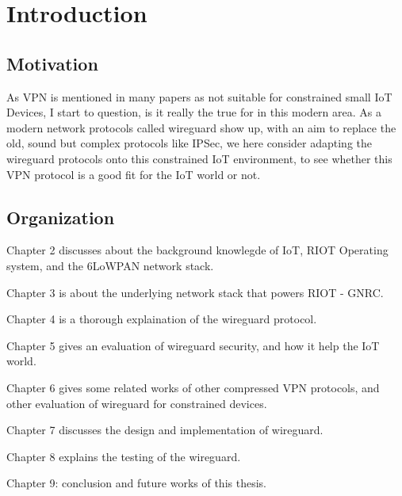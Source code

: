 \chapter{Introduction}
\section{Motivation}
  As VPN is mentioned in many papers as not suitable for constrained small IoT Devices, 
  I start to question, is it really the true for in this modern area. 
  As a modern network protocols called wireguard show up, with an aim to replace
  the old, sound but complex protocols like IPSec, we here consider adapting the wireguard
  protocols onto this constrained IoT environment, to see whether this VPN protocol is 
  a good fit for the IoT world or not.
\section{Organization}

  Chapter 2 discusses about the background knowlegde of IoT, RIOT Operating system, and the
  6LoWPAN network stack.

  Chapter 3 is about the underlying network stack that powers RIOT - GNRC.

  Chapter 4 is a thorough explaination of the wireguard protocol.

  Chapter 5 gives an evaluation of wireguard security, and how it help
  the IoT world.

  Chapter 6 gives some related works of other compressed VPN protocols, 
  and other evaluation of wireguard for constrained devices.

  Chapter 7 discusses the design and implementation of wireguard.

  Chapter 8 explains the testing of the wireguard.

  Chapter 9: conclusion and future works of this thesis.
